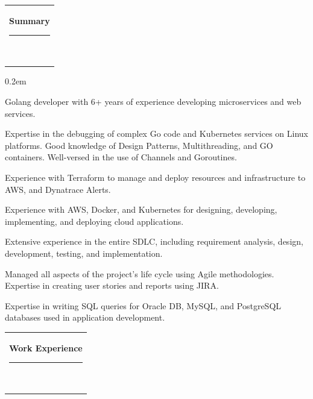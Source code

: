 \documentclass[11pt,A4]{article}
\newcommand{\mpwidth}{\linewidth-\fboxsep-\fboxsep}
\newcommand{\cvlist}[1] {
	\begin{itemize}{#1}\end{itemize}
}
\newcommand{\cvtext}[1] {
	\begin{tabular*}{1\mpwidth}{p{0.96\mpwidth}}
		\parbox{1\mpwidth}{#1}
	\end{tabular*}
}
\newcommand{\cvsection}[1] {
	
\cvtext{
		\textbf{\LARGE{\textcolor{darkcol}{{#1}}}}\\[-6pt]
		\textcolor{maincol}{ \rule{0.1\textwidth}{1pt} } \\
	}
}
\begin{document}
\cvsection{Summary}

{\cvlist{
\itemsep0.2em
\item Golang developer with 6+ years of experience developing microservices and web services. 
\item Expertise in the debugging of complex Go code and Kubernetes services on Linux platforms. Good knowledge of Design Patterns, Multithreading, and GO containers. Well-versed in the use of Channels and Goroutines.
\item Experience with Terraform to manage and deploy resources and infrastructure to AWS, and Dynatrace Alerts.
\item Experience with AWS, Docker, and Kubernetes for designing, developing, implementing, and deploying cloud applications.

\item Extensive experience in the entire SDLC, including requirement analysis, design, development, testing, and implementation.

\item Managed all aspects of the project's life cycle using Agile methodologies. Expertise in creating user stories and reports using JIRA.

\item Expertise in writing SQL queries for Oracle DB, MySQL, and PostgreSQL databases used in application development.

}}
\vspace{15pt}

\cvsection{Work Experience}
\end{document}

